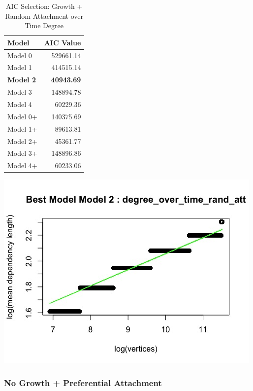 \documentclass[12pt, a4paper]{article}
\begin{document}
\begin{table}[H]
    \centering
    \begin{tabular}{l r}
        Model & AIC Value\\
        \hline
        Model 0  &  529661.14\\
        Model 1  &  414515.14\\
        \textbf{Model 2}  &  \textbf{40943.69}\\
        Model 3  &  148894.78\\
        Model 4  &  60229.36\\
        Model 0+  &  140375.69\\
        Model 1+  &  89613.81\\
        Model 2+  & 45361.77\\
        Model 3+  &  148896.86\\
        Model 4+  &  60233.06\\
    \end{tabular}
    \caption{AIC Selection: Growth + Random Attachment over Time Degree}
    \label{table:time_grow_ran_att_1}
\end{table}


\begin{minipage}[t]{\linewidth}
    \includegraphics[width=\textwidth]{time_growth_degree_best_fit_rand_att}
    \captionsetup{type=figure}
    \label{fig:time_growth_degree_best_fit_rand_att}
  \end{minipage}

\subsubsection{No Growth + Preferential Attachment}
\end{document}
